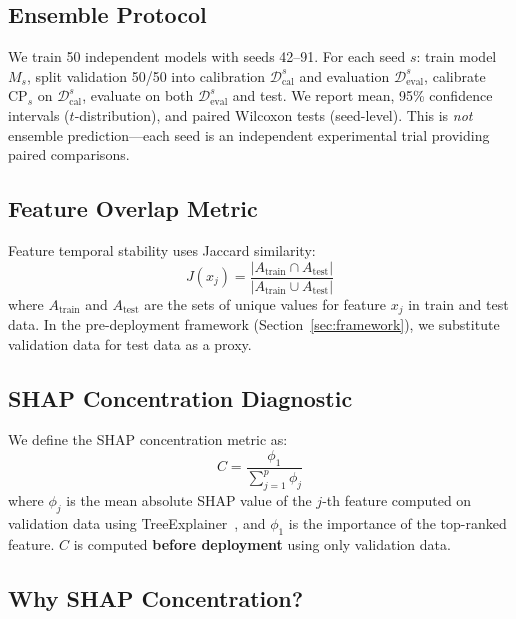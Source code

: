 \documentclass{uai2026} %
\begin{document}
\subsection{Ensemble Protocol}

We train 50 independent models with seeds 42--91. For each seed $s$: train model $M_s$, split validation 50/50 into calibration $\mathcal{D}_{\text{cal}}^s$ and evaluation $\mathcal{D}_{\text{eval}}^s$, calibrate $\text{CP}_s$ on $\mathcal{D}_{\text{cal}}^s$, evaluate on both $\mathcal{D}_{\text{eval}}^s$ and test. We report mean, 95\% confidence intervals ($t$-distribution), and paired Wilcoxon tests (seed-level). This is \textit{not} ensemble prediction---each seed is an independent experimental trial providing paired comparisons.

\subsection{Feature Overlap Metric}

Feature temporal stability uses Jaccard similarity:
\begin{equation}\label{eq:jaccard}
J(x_j) = \frac{|A_{\text{train}} \cap A_{\text{test}}|}{|A_{\text{train}} \cup A_{\text{test}}|}
\end{equation}
where $A_{\text{train}}$ and $A_{\text{test}}$ are the sets of unique values for feature $x_j$ in train and test data. In the pre-deployment framework (Section~\ref{sec:framework}), we substitute validation data for test data as a proxy.

\subsection{SHAP Concentration Diagnostic}\label{sec:shap_method}

We define the SHAP concentration metric as:
\begin{equation}\label{eq:concentration}
C = \frac{\phi_1}{\sum_{j=1}^{p} \phi_j}
\end{equation}
where $\phi_j$ is the mean absolute SHAP value of the $j$-th feature computed on validation data using TreeExplainer~\citep{lundberg2020local}, and $\phi_1$ is the importance of the top-ranked feature. $C$ is computed \textbf{before deployment} using only validation data.

\subsection{Why SHAP Concentration?}\label{sec:why_shap}
\end{document}
